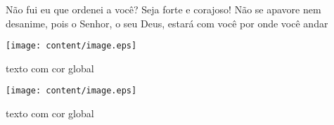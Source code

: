 \begin{slide-frame}
\thispagestyle{empty}
\end{slide-frame}

\begin{slide-frame-center}
\noindent
Não fui eu que ordenei a você? Seja forte e corajoso! Não se apavore nem desanime, 
pois o Senhor, o seu Deus, estará com você por onde você andar
\end{slide-frame-center}

\begin{slide-frame}
\centering
\texttt{[image: content/image.eps]}
\end{slide-frame}

\begin{slide-frame}
\begin{book-box}texto com cor global\end{book-box}
\lipsum[1][1-2]
\end{slide-frame}

\begin{slide-frame}
\centering
\lipsum[1][1-3]

\texttt{[image: content/image.eps]}
\begin{book-box}texto com cor global\end{book-box}
\end{slide-frame}

